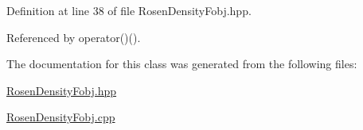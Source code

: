 \-Definition at line 38 of file \-Rosen\-Density\-Fobj.\-hpp.



\-Referenced by operator()().



\-The documentation for this class was generated from the following files\-:\begin{DoxyCompactItemize}
\item 
\hyperlink{RosenDensityFobj_8hpp}{\-Rosen\-Density\-Fobj.\-hpp}\item 
\hyperlink{RosenDensityFobj_8cpp}{\-Rosen\-Density\-Fobj.\-cpp}\end{DoxyCompactItemize}

